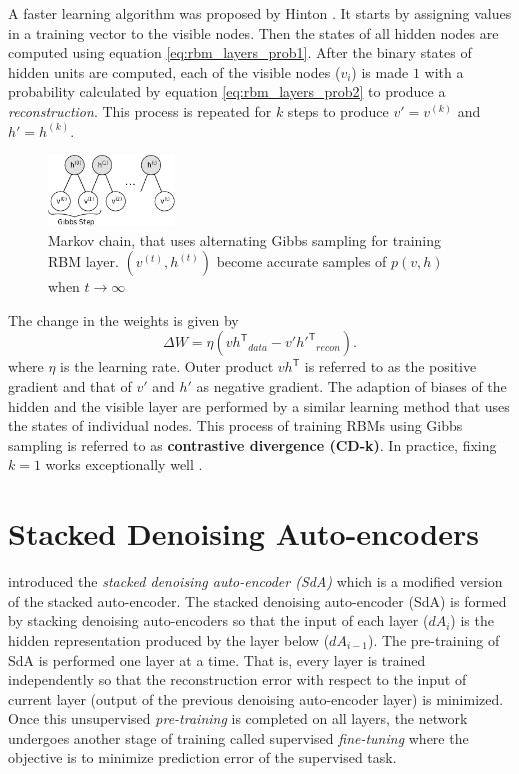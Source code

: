 A faster learning algorithm was proposed by Hinton \cite{hinton2002training,hinton2006reducing,hinton2010practical}.  It starts by assigning values in a training vector to the visible nodes.  Then the states of all hidden nodes are computed using equation \ref{eq:rbm_layers_prob1}.  After the binary states of hidden units are computed, each of the visible nodes ($v_i$) is made $1$ with a probability calculated by equation \ref{eq:rbm_layers_prob2} to produce a \textit{reconstruction}.  This process is repeated for $k$ steps to produce $v'= v^{(k)}$ and $h' = h^{(k)}$. 

\begin{figure}[ht]
\centering
\includegraphics[width=0.3\textwidth]{./imgs/markov_chain.png}
\caption[Markov chain of training RBM layer]{Markov chain, that uses alternating Gibbs sampling for training RBM layer. $(v^{(t)}, h^{(t)})$ become accurate samples of $p(v,h)$ when $t \rightarrow \infty$}
\label{fig:rbmmarkovChain}
\end{figure}

The change in the weights is given by
$$ \Delta W = \eta ({vh^\mathsf{T}}_{data} - {v'h'^{\mathsf{T}}}_{recon}). $$
where $\eta$ is the learning rate.  Outer product $vh^\mathsf{T}$ is referred to as the positive gradient and that of $v'$ and $h'$ as negative gradient.  The adaption of biases of the hidden and the visible layer are performed by a similar learning method that uses the states of individual nodes.  This process of training RBMs using Gibbs sampling is referred to as \textbf{contrastive divergence (CD-k)}.  In practice, fixing $k=1$ works exceptionally well \cite{hinton2010practical}.

\section{Stacked Denoising Auto-encoders}
\citet{vincent2010stacked} introduced the \emph{stacked denoising auto-encoder (SdA)} which is a modified version of the stacked auto-encoder.  The stacked denoising auto-encoder (SdA) is formed by stacking denoising auto-encoders so that the input of each layer ($dA_i$) is the hidden representation produced by the layer below ($dA_{i-1}$).  The pre-training of SdA is performed one layer at a time.  That is, every layer is trained independently so that the reconstruction error with respect to the input of current layer (output of the previous denoising auto-encoder layer) is minimized.  Once this unsupervised \textit{pre-training} is completed on all layers, the network undergoes another stage of training called supervised \textit{fine-tuning} where the objective is to minimize prediction error of the supervised task.


